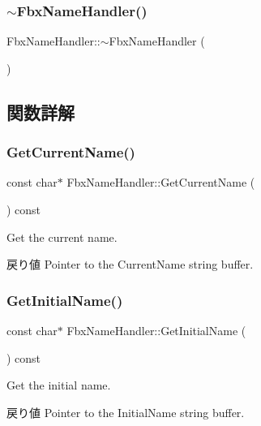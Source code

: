 \subsubsection{\texorpdfstring{$\sim$\+Fbx\+Name\+Handler()}{~FbxNameHandler()}}
{\footnotesize\ttfamily Fbx\+Name\+Handler\+::$\sim$\+Fbx\+Name\+Handler (\begin{DoxyParamCaption}{ }\end{DoxyParamCaption})}



\subsection{関数詳解}
\mbox{\label{class_fbx_name_handler_a1be12daa1efe1f289972f7cb81bc64fb}} 
\subsubsection{\texorpdfstring{Get\+Current\+Name()}{GetCurrentName()}}
{\footnotesize\ttfamily const char$\ast$ Fbx\+Name\+Handler\+::\+Get\+Current\+Name (\begin{DoxyParamCaption}{ }\end{DoxyParamCaption}) const}

Get the current name. \begin{DoxyReturn}{戻り値}
Pointer to the Current\+Name string buffer. 
\end{DoxyReturn}
\mbox{\label{class_fbx_name_handler_a266f9693873fa9042673fac6b1ae630d}} 
\subsubsection{\texorpdfstring{Get\+Initial\+Name()}{GetInitialName()}}
{\footnotesize\ttfamily const char$\ast$ Fbx\+Name\+Handler\+::\+Get\+Initial\+Name (\begin{DoxyParamCaption}{ }\end{DoxyParamCaption}) const}

Get the initial name. \begin{DoxyReturn}{戻り値}
Pointer to the Initial\+Name string buffer. 
\end{DoxyReturn}
\mbox{\label{class_fbx_name_handler_a7767797106861dea5bef81b8ab592dfd}} 
